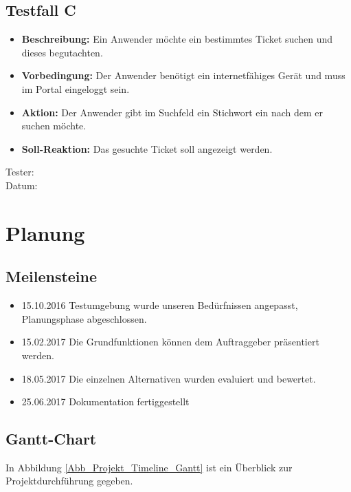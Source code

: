 \subsection{Testfall C}
\begin{itemize}
	\item \textbf{Beschreibung:} Ein Anwender möchte ein bestimmtes Ticket suchen und dieses begutachten. 
	\item \textbf{Vorbedingung:} Der Anwender benötigt ein internetfähiges Gerät und muss im Portal eingeloggt sein.
	\item \textbf{Aktion:} Der Anwender gibt im Suchfeld ein Stichwort ein nach dem er suchen möchte. 
	\item \textbf{Soll-Reaktion:} Das gesuchte Ticket soll angezeigt werden.
\end{itemize}
Tester:
\\
Datum:




\section{Planung}
\subsection{Meilensteine}
\begin{itemize}
	\item 15.10.2016 Testumgebung wurde unseren Bedürfnissen angepasst, Planungsphase abgeschlossen.
	\item 15.02.2017 Die Grundfunktionen können dem Auftraggeber präsentiert werden.
	\item 18.05.2017 Die einzelnen Alternativen wurden evaluiert und bewertet.
	\item 25.06.2017 Dokumentation fertiggestellt
\end{itemize}

\subsection{Gantt-Chart}
In Abbildung \ref{Abb_Projekt_Timeline_Gantt} ist ein Überblick zur Projektdurchführung gegeben.

